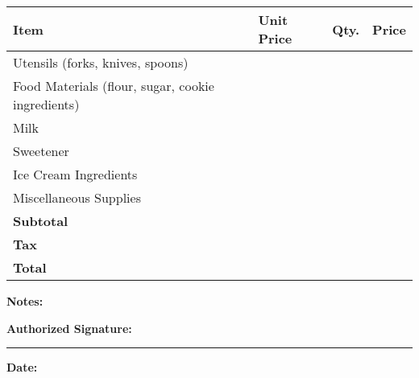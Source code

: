 \documentclass[a4paper]{article}
\begin{document}
\begin{tabularx}{\textwidth}{L{0.70\textwidth} C{0.115\textwidth} C{0.115\textwidth} R{0.06\textwidth}}
\toprule
\textbf{Item} & \textbf{Unit Price} & \textbf{Qty.} & \textbf{Price} \\
\midrule
Utensils (forks, knives, spoons) & \underline{\hspace{1cm}} & \underline{\hspace{1cm}} & \underline{\hspace{1cm}} \\
Food Materials (flour, sugar, cookie ingredients) & \underline{\hspace{1cm}} & \underline{\hspace{1cm}} & \underline{\hspace{1cm}} \\
Milk & \underline{\hspace{1cm}} & \underline{\hspace{1cm}} & \underline{\hspace{1cm}} \\
Sweetener & \underline{\hspace{1cm}} & \underline{\hspace{1cm}} & \underline{\hspace{1cm}} \\
Ice Cream Ingredients & \underline{\hspace{1cm}} & \underline{\hspace{1cm}} & \underline{\hspace{1cm}} \\
Miscellaneous Supplies & \underline{\hspace{1cm}} & \underline{\hspace{1cm}} & \underline{\hspace{1cm}} \\
\midrule
\textbf{Subtotal} & & & \underline{\hspace{1cm}} \\
\textbf{Tax} & & & \underline{\hspace{1cm}} \\
\textbf{Total} & & & \underline{\hspace{1cm}} \\
\bottomrule
\end{tabularx}

\vspace{1cm}

\noindent \textbf{Notes:} \underline{\hspace{\textwidth}}

\vspace{1cm}

\noindent \textbf{Authorized Signature:}\rule{5cm}{0.4pt} \hfill \textbf{Date:}\underline{\hspace{3cm}}
\end{document}
